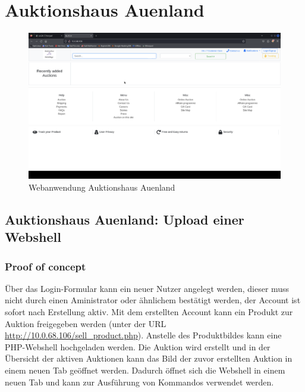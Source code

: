 \pagebreak
\chapter{Auktionshaus Auenland}

\begin{figure}[!ht]
    \centering
    \includegraphics[width=\linewidth]{images/screenshots/08_auktionshaus.png}
    \caption{Webanwendung Auktionshaus Auenland}
    \label{fig:06_auktionshaus}
\end{figure}
\newpage


\section{\makecvssbadge Auktionshaus Auenland: Upload einer Webshell}

\subsection*{Proof of concept}
Über das Login-Formular kann ein neuer Nutzer angelegt werden, dieser muss nicht durch einen Aministrator oder ähnlichem bestätigt werden, der Account ist sofort nach Erstellung aktiv. Mit dem erstellten Account kann ein Produkt zur Auktion freigegeben werden (unter der URL \url{http://10.0.68.106/sell_product.php}). Anstelle des Produktbildes kann eine PHP-Webshell hochgeladen werden. Die Auktion wird erstellt und in der Übersicht der aktiven Auktionen kann das Bild der zuvor erstellten Auktion in einem neuen Tab geöffnet werden. Dadurch öffnet sich die Webshell in einem neuen Tab und kann zur Ausführung von Kommandos verwendet werden.

